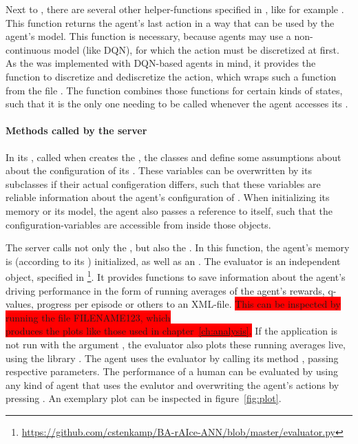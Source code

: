 Next to , there are several other helper-functions specified in , like for example . This function returns the agent's last action in a way that can be used by the agent's model. This function is necessary, because agents may use a non-continuous model (like DQN), for which the action must be discretized at first. As the  was implemented with DQN-based agents in mind, it provides the function to discretize and dediscretize the action, which wraps such a function from the file . The function  combines those functions for certain kinds of states, such that it is the only one needing to be called whenever the agent accesses its .

\paragraph{Methods called by the server}

In its , called when  creates the , the classes  and  define some assumptions about about the configuration of its . These variables can be overwritten by its subclasses if their actual configeration differs, such that these variables are reliable information about the agent's configuration of . When initializing its memory or its model, the agent also passes a reference to itself, such that the configuration-variables are accessible from inside those objects. 

The server calls not only the , but also the . In this function, the agent's memory is (according to its ) initialized, as well as an . The evaluator is an independent object, specified in \footnote{\url{https://github.com/cstenkamp/BA-rAIce-ANN/blob/master/evaluator.py}}. It provides functions to save information about the agent's driving performance in the form of running averages of the agent's rewards, q-values, progress per episode or others to an XML-file. \colorbox{red}{This can be inspected by running the file FILENAME123, which \\ produces the plots like those used in chapter~\ref{ch:analysis}.} If the application is not run with the argument , the evaluator also plots these running averages live, using the library . The agent uses the evaluator by calling its method , passing respective parameters. The performance of a human can be evaluated by using any kind of agent that uses the evalutor and overwriting the agent's actions by pressing . An exemplary plot can be inspected in figure~\ref{fig:plot}.

